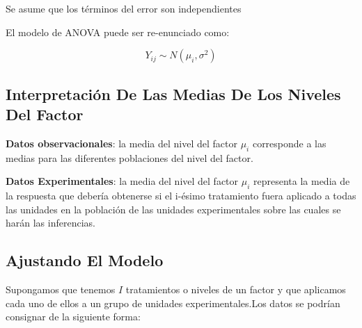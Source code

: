 \documentclass[]{book}
\theoremstyle{definition}
\theoremstyle{definition}
\theoremstyle{definition}
\theoremstyle{remark}
\begin{document}
Se asume que los términos del error son independientes

El modelo de ANOVA puede ser re-enunciado como:

\[
Y_{ij}\sim N(\mu_{i},\sigma^{2})
\]

\hypertarget{interpretacion-de-las-medias-de-los-niveles-del-factor}{%
\subsection{Interpretación De Las Medias De Los Niveles Del
Factor}\label{interpretacion-de-las-medias-de-los-niveles-del-factor}}

\textbf{Datos observacionales}: la media del nivel del factor
\(\mu_{i}\) corresponde a las medias para las diferentes poblaciones del
nivel del factor.

\textbf{Datos Experimentales}: la media del nivel del factor \(\mu_{i}\)
representa la media de la respuesta que debería obtenerse si el i-ésimo
tratamiento fuera aplicado a todas las unidades en la población de las
unidades experimentales sobre las cuales se harán las inferencias.

\hypertarget{ajustando-el-modelo}{%
\subsection{Ajustando El Modelo}\label{ajustando-el-modelo}}

Supongamos que tenemos \(I\) tratamientos o niveles de un factor y que
aplicamos cada uno de ellos a un grupo de unidades experimentales.Los
datos se podrían consignar de la siguiente forma:
\end{document}
